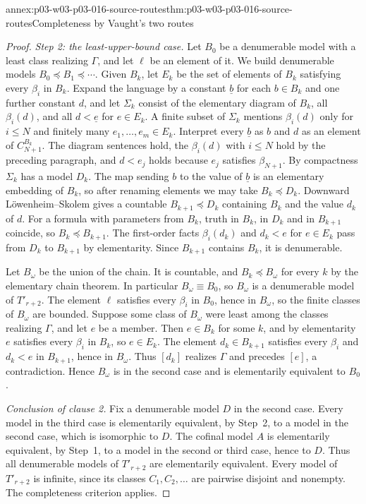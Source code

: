 \begin{annexitem}{annex:p03-w03-p03-016-source-routes}{thm:p03-w03-p03-016-source-routes}{Completeness by Vaught's two routes}
\begin{proof}
\emph{Step 2: the least-upper-bound case.} Let \(B_0\) be a denumerable
model with a least class realizing \(\Gamma\), and let \(\ell\) be an
element of it. We build denumerable models
\(B_0\preccurlyeq B_1\preccurlyeq\cdots\). Given \(B_k\), let \(E_k\) be
the set of elements of \(B_k\) satisfying every \(\beta_i\) in \(B_k\).
Expand the language by a constant \(\underline b\) for each \(b\in B_k\)
and one further constant \(d\), and let \(\Sigma_k\) consist of the
elementary diagram of \(B_k\), all \(\beta_i(d)\), and all
\(d<\underline e\) for \(e\in E_k\). A finite subset of \(\Sigma_k\)
mentions \(\beta_i(d)\) only for \(i\le N\) and finitely many
\(e_1,\ldots,e_m\in E_k\). Interpret every \(\underline b\) as \(b\) and
\(d\) as an element of \(C_{N+1}^{B_k}\). The diagram sentences hold, the
\(\beta_i(d)\) with \(i\le N\) hold by the preceding paragraph, and
\(d<e_j\) holds because \(e_j\) satisfies \(\beta_{N+1}\). By compactness
\(\Sigma_k\) has a model \(D_k\). The map sending \(b\) to the value of
\(\underline b\) is an elementary embedding of \(B_k\), so after renaming
elements we may take \(B_k\preccurlyeq D_k\). Downward
L\"owenheim--Skolem gives a countable \(B_{k+1}\preccurlyeq D_k\)
containing \(B_k\) and the value \(d_k\) of \(d\). For a formula with
parameters from \(B_k\), truth in \(B_k\), in \(D_k\) and in \(B_{k+1}\)
coincide, so \(B_k\preccurlyeq B_{k+1}\). The first-order facts
\(\beta_i(d_k)\) and \(d_k<e\) for \(e\in E_k\) pass from \(D_k\) to
\(B_{k+1}\) by elementarity. Since \(B_{k+1}\) contains \(B_k\), it is
denumerable.

Let \(B_\omega\) be the union of the chain. It is countable, and
\(B_k\preccurlyeq B_\omega\) for every \(k\) by the elementary chain
theorem. In particular \(B_\omega\equiv B_0\), so \(B_\omega\) is a
denumerable model of \(T'_{r+2}\). The element \(\ell\) satisfies every
\(\beta_i\) in \(B_0\), hence in \(B_\omega\), so the finite classes of
\(B_\omega\) are bounded. Suppose some class of \(B_\omega\) were least
among the classes realizing \(\Gamma\), and let \(e\) be a member. Then
\(e\in B_k\) for some \(k\), and by elementarity \(e\) satisfies every
\(\beta_i\) in \(B_k\), so \(e\in E_k\). The element \(d_k\in B_{k+1}\)
satisfies every \(\beta_i\) and \(d_k<e\) in \(B_{k+1}\), hence in
\(B_\omega\). Thus \([d_k]\) realizes \(\Gamma\) and precedes \([e]\), a
contradiction. Hence \(B_\omega\) is in the second case and is elementarily
equivalent to \(B_0\).

\emph{Conclusion of clause 2.} Fix a denumerable model \(D\) in the second
case. Every model in the third case is elementarily equivalent, by Step~2,
to a model in the second case, which is isomorphic to \(D\). The cofinal
model \(A\) is elementarily equivalent, by Step~1, to a model in the second
or third case, hence to \(D\). Thus all denumerable models of
\(T'_{r+2}\) are elementarily equivalent. Every model of \(T'_{r+2}\) is
infinite, since its classes \(C_1,C_2,\ldots\) are pairwise disjoint and
nonempty. The completeness criterion applies.
\end{proof}
\end{annexitem}

